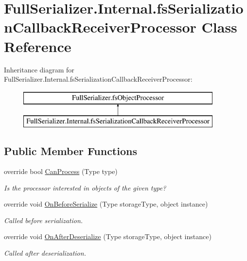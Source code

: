 \hypertarget{class_full_serializer_1_1_internal_1_1fs_serialization_callback_receiver_processor}{}\section{Full\+Serializer.\+Internal.\+fs\+Serialization\+Callback\+Receiver\+Processor Class Reference}
\label{class_full_serializer_1_1_internal_1_1fs_serialization_callback_receiver_processor}
Inheritance diagram for Full\+Serializer.\+Internal.\+fs\+Serialization\+Callback\+Receiver\+Processor\+:\begin{figure}[H]
\begin{center}
\leavevmode
\includegraphics[height=2.000000cm]{class_full_serializer_1_1_internal_1_1fs_serialization_callback_receiver_processor}
\end{center}
\end{figure}
\subsection*{Public Member Functions}
\begin{DoxyCompactItemize}
\item 
override bool \hyperlink{class_full_serializer_1_1_internal_1_1fs_serialization_callback_receiver_processor_ae3e6db6e345aea48bb0cb8e63e8f4d6f}{Can\+Process} (Type type)
\begin{DoxyCompactList}\small\item\em Is the processor interested in objects of the given type? \end{DoxyCompactList}\item 
override void \hyperlink{class_full_serializer_1_1_internal_1_1fs_serialization_callback_receiver_processor_a8013e3b964d24ee85c19fcd33997c104}{On\+Before\+Serialize} (Type storage\+Type, object instance)
\begin{DoxyCompactList}\small\item\em Called before serialization. \end{DoxyCompactList}\item 
override void \hyperlink{class_full_serializer_1_1_internal_1_1fs_serialization_callback_receiver_processor_a29733358c2bfa204e3a043fbc28d644d}{On\+After\+Deserialize} (Type storage\+Type, object instance)
\begin{DoxyCompactList}\small\item\em Called after deserialization. \end{DoxyCompactList}\end{DoxyCompactItemize}


